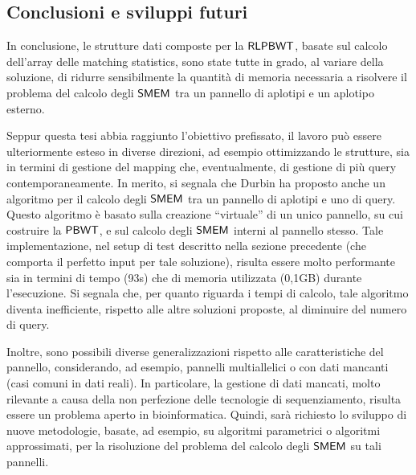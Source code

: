 \documentclass[a4paper,11pt, oneside,italian]{article}
\def\PBWT{\mbox{\rm {\sf PBWT}}}
\def\RLPBWT{\mbox{\rm {\sf RLPBWT}}}
\def\SMEM{\mbox{\rm {\sf SMEM}}}
\begin{document}
\subsection*{Conclusioni e sviluppi futuri}
In conclusione, le strutture dati composte per la $\RLPBWT$, basate sul calcolo
dell'array delle matching statistics, sono state tutte in
grado, al variare della soluzione, di ridurre sensibilmente la 
quantità di memoria necessaria a risolvere il problema del calcolo degli $\SMEM$
tra un pannello di aplotipi e un aplotipo esterno.  

Seppur questa tesi abbia raggiunto l'obiettivo prefissato, il lavoro può essere
ulteriormente esteso in diverse direzioni, ad esempio ottimizzando le strutture,
sia in termini  
di gestione del mapping che, eventualmente, di gestione di più query
contemporaneamente. In merito, si segnala che Durbin
ha proposto anche un algoritmo per il calcolo degli $\SMEM$ tra un pannello di
aplotipi e uno di query. Questo algoritmo è basato sulla creazione ``virtuale''
di un unico pannello, su cui 
costruire la $\PBWT$, e sul calcolo degli $\SMEM$ interni al pannello stesso. Tale
implementazione, nel setup di test 
descritto nella sezione precedente (che comporta il perfetto input per
tale soluzione), risulta essere molto performante sia in
termini di tempo (93s) che di memoria utilizzata (0,1GB) durante
l'esecuzione. Si segnala che, per quanto riguarda i tempi di calcolo, tale
algoritmo diventa inefficiente, rispetto alle altre soluzioni proposte, al
diminuire del numero di query. 

Inoltre, sono possibili diverse generalizzazioni rispetto alle caratteristiche
del pannello, considerando, ad esempio, pannelli multiallelici o con dati
mancanti (casi comuni in dati reali). In particolare, la gestione 
di dati 
mancati, molto rilevante a causa della non perfezione delle tecnologie di
sequenziamento, risulta essere un problema aperto in bioinformatica. Quindi,
sarà richiesto lo sviluppo di nuove metodologie, basate, ad esempio,
su algoritmi parametrici o algoritmi approssimati, per la risoluzione del
problema del calcolo degli $\SMEM$ su tali pannelli.
\end{document}
